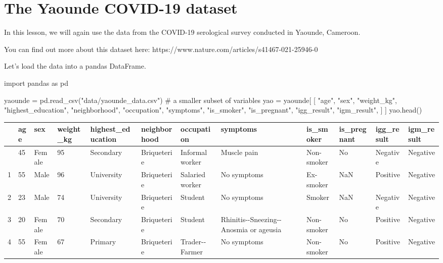 \documentclass[
  letterpaper,
  DIV=11,
  numbers=noendperiod]{scrreprt}
\newenvironment{Shaded}{\begin{snugshade}}{\end{snugshade}}
\newcommand{\CommentTok}[1]{\textcolor[rgb]{0.37,0.37,0.37}{#1}}
\newcommand{\ImportTok}[1]{\textcolor[rgb]{0.00,0.46,0.62}{#1}}
\newcommand{\NormalTok}[1]{\textcolor[rgb]{0.00,0.23,0.31}{#1}}
\newcommand{\OperatorTok}[1]{\textcolor[rgb]{0.37,0.37,0.37}{#1}}
\newcommand{\StringTok}[1]{\textcolor[rgb]{0.13,0.47,0.30}{#1}}
\begin{document}
\section{The Yaounde COVID-19
dataset}\label{the-yaounde-covid-19-dataset-1}

In this lesson, we will again use the data from the COVID-19 serological
survey conducted in Yaounde, Cameroon.

You can find out more about this dataset here:
https://www.nature.com/articles/s41467-021-25946-0

Let's load the data into a pandas DataFrame.

\begin{Shaded}
\begin{Highlighting}[]
\ImportTok{import}\NormalTok{ pandas }\ImportTok{as}\NormalTok{ pd}

\NormalTok{yaounde }\OperatorTok{=}\NormalTok{ pd.read\_csv(}\StringTok{"data/yaounde\_data.csv"}\NormalTok{)}
\CommentTok{\# a smaller subset of variables}
\NormalTok{yao }\OperatorTok{=}\NormalTok{ yaounde[}
\NormalTok{    [}
        \StringTok{"age"}\NormalTok{,}
        \StringTok{"sex"}\NormalTok{,}
        \StringTok{"weight\_kg"}\NormalTok{,}
        \StringTok{"highest\_education"}\NormalTok{,}
        \StringTok{"neighborhood"}\NormalTok{,}
        \StringTok{"occupation"}\NormalTok{,}
        \StringTok{"symptoms"}\NormalTok{,}
        \StringTok{"is\_smoker"}\NormalTok{,}
        \StringTok{"is\_pregnant"}\NormalTok{,}
        \StringTok{"igg\_result"}\NormalTok{,}
        \StringTok{"igm\_result"}\NormalTok{,}
\NormalTok{    ]}
\NormalTok{]}
\NormalTok{yao.head()}
\end{Highlighting}
\end{Shaded}

\begin{longtable}[]{@{}llllllllllll@{}}
\toprule\noalign{}
& age & sex & weight\_kg & highest\_education & neighborhood &
occupation & symptoms & is\_smoker & is\_pregnant & igg\_result &
igm\_result \\
\midrule\noalign{}
\endhead
\bottomrule\noalign{}
\endlastfoot
0 & 45 & Female & 95 & Secondary & Briqueterie & Informal worker &
Muscle pain & Non-smoker & No & Negative & Negative \\
1 & 55 & Male & 96 & University & Briqueterie & Salaried worker & No
symptoms & Ex-smoker & NaN & Positive & Negative \\
2 & 23 & Male & 74 & University & Briqueterie & Student & No symptoms &
Smoker & NaN & Negative & Negative \\
3 & 20 & Female & 70 & Secondary & Briqueterie & Student &
Rhinitis-\/-Sneezing-\/-Anosmia or ageusia & Non-smoker & No & Positive
& Negative \\
4 & 55 & Female & 67 & Primary & Briqueterie & Trader-\/-Farmer & No
symptoms & Non-smoker & No & Positive & Negative \\
\end{longtable}
\end{document}
